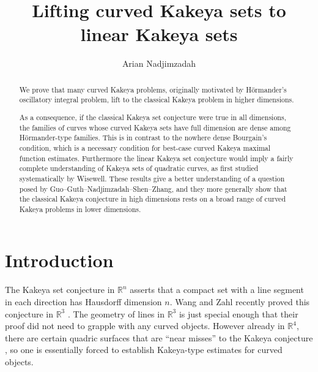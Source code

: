 \documentclass[reqno,11pt]{amsart}
\numberwithin{equation}{section}
\numberwithin{figure}{section}
\def\R{\mathbb{R}}
\theoremstyle{plain}
\theoremstyle{definition}
\begin{document}
	
	
	\title{Lifting curved Kakeya sets to linear Kakeya sets}
 
	\author{Arian Nadjimzadah}
	\address{UCLA Department of Mathematics, Los Angeles, CA 90095.}
	
	
	
	
	\date{}
	
	\keywords{}
	

    \begin{abstract}
        We prove that many curved Kakeya problems, originally motivated by H\"ormander's oscillatory integral problem, lift to the classical Kakeya problem in higher dimensions. 
        
    
        
        As a consequence, if the classical Kakeya set conjecture were true in all dimensions, 
        the families of curves whose curved Kakeya sets have full dimension are dense among H\"ormander-type families. This is in contrast to the nowhere dense Bourgain's condition, which is a necessary condition for best-case curved Kakeya maximal function estimates. 
        Furthermore the linear Kakeya set conjecture would imply a fairly complete understanding of Kakeya sets of quadratic curves, as first studied systematically by Wisewell. These results give a better understanding of a question posed by Guo--Guth--Nadjimzadah--Shen--Zhang, and they more generally show that the classical Kakeya conjecture in high dimensions rests on a broad range of curved Kakeya problems in lower dimensions. 
    \end{abstract}
	
	\maketitle

    

    \section{Introduction}

    The Kakeya set conjecture in $\R^n$ asserts that a compact set with a line segment in each direction has Hausdorff dimension $n$. 
    Wang and Zahl recently proved this conjecture in $\R^3$ \cite{wang2025volumeestimatesunionsconvex}. The geometry of lines in $\R^3$ is just special enough that their proof did not need to grapple with any curved objects. 
    However already in $\R^4$, there are certain quadric surfaces that are ``near misses'' to the Kakeya conjecture \cite{guth2025introductionproofkakeyaconjecture}, so one is essentially forced to establish Kakeya-type estimates for curved objects. 
    
\end{document}
